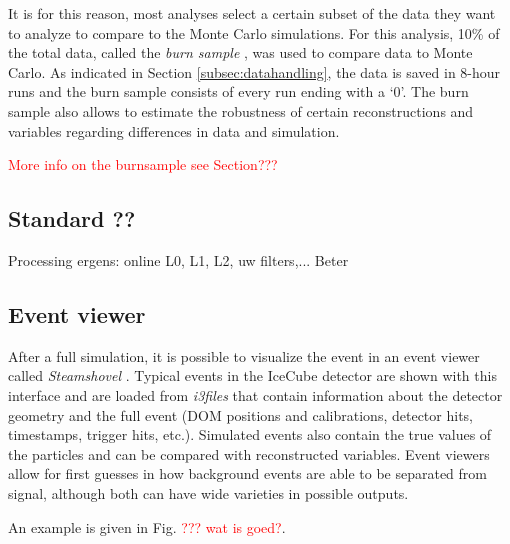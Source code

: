 It is for this reason, most analyses select a certain subset of the data they want to analyze to compare to the Monte Carlo simulations. For this analysis, 10\% of the total data, called the \textit{burn sample} , was used to compare data to Monte Carlo. As indicated in Section \ref{subsec:datahandling}, the data is saved in 8-hour runs and the burn sample consists of every run ending with a `0'. The burn sample also allows to estimate the robustness of certain reconstructions and variables regarding differences in data and simulation.


\textcolor{red}{More info on the burnsample see Section???\\}

\subsection{Standard ??}
\noindent Processing ergens: online L0, L1, L2, uw filters,... Beter

\subsection{Event viewer}
After a full simulation, it is possible to visualize the event in an event viewer called \textit{Steamshovel} . Typical events in the IceCube detector are shown with this interface and are loaded from \textit{i3files} that contain information about the detector geometry and the full event (DOM positions and calibrations, detector hits, timestamps, trigger hits, etc.). Simulated events also contain the true values of the particles and can be compared with reconstructed variables. Event viewers allow for first guesses in how background events are able to be separated from signal, although both can have wide varieties in possible outputs.

An example is given in Fig. \textcolor{red}{??? wat is goed?}.